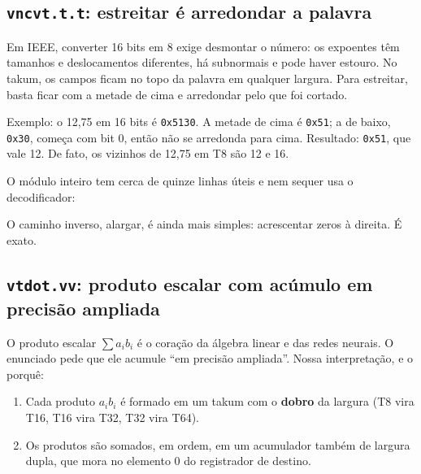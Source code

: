 \documentclass[11pt,a4paper]{article}
\newcommand{\code}[1]{\texttt{#1}}
\begin{document}
\subsection{\code{vncvt.t.t}: estreitar é arredondar a palavra}

Em IEEE, converter 16 bits em 8 exige desmontar o número: os expoentes têm tamanhos e deslocamentos
diferentes, há subnormais e pode haver estouro. No takum, os campos ficam no topo da palavra em qualquer
largura. Para estreitar, basta ficar com a metade de cima e arredondar pelo que foi cortado.

Exemplo: o 12,75 em 16 bits é \code{0x5130}. A metade de cima é \code{0x51}; a de baixo, \code{0x30},
começa com bit 0, então não se arredonda para cima. Resultado: \code{0x51}, que vale 12. De fato, os
vizinhos de 12,75 em T8 são 12 e 16.

O módulo inteiro tem cerca de quinze linhas úteis e nem sequer usa o decodificador:



O caminho inverso, alargar, é ainda mais simples: acrescentar zeros à direita. É exato.

\subsection{\code{vtdot.vv}: produto escalar com acúmulo em precisão ampliada}

O produto escalar $\sum a_i b_i$ é o coração da álgebra linear e das redes neurais. O enunciado pede que
ele acumule ``em precisão ampliada''. Nossa interpretação, e o porquê:

\begin{enumerate}
  \item Cada produto $a_i b_i$ é formado em um takum com o \textbf{dobro} da largura (T8 vira T16, T16
        vira T32, T32 vira T64).
  \item Os produtos são somados, em ordem, em um acumulador também de largura dupla, que mora no elemento
        0 do registrador de destino.
\end{enumerate}
\end{document}

